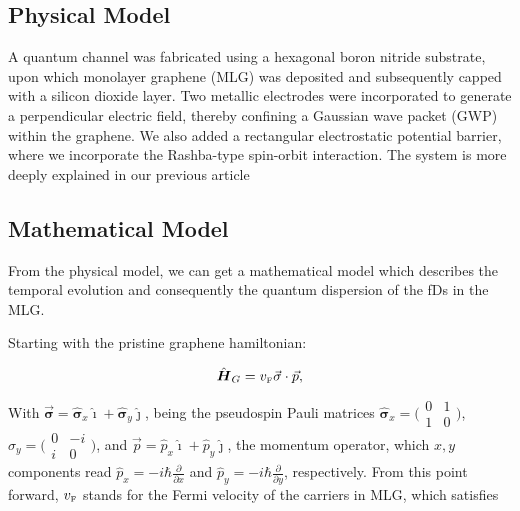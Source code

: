     \subsection{Physical Model}\label{subsec:physical-model}

    A quantum channel was fabricated using a hexagonal boron nitride substrate, upon which monolayer graphene (MLG) was deposited and subsequently capped with a silicon dioxide layer.
     Two metallic electrodes were incorporated to generate a perpendicular electric field, thereby confining a Gaussian wave packet (GWP) within the graphene.
     We also added a rectangular electrostatic potential barrier, where we incorporate the Rashba-type spin-orbit interaction.
     The system is more deeply explained in our previous article\cite{Serna2019}


    \subsection{Mathematical Model}\label{subsec:mathematical-model}

    From the physical model, we can get a mathematical model which describes the temporal evolution and consequently the quantum dispersion of the fDs in the MLG\@.

    Starting with the pristine graphene hamiltonian\cite{Geimk2007}:

    \begin{equation}
        \label{eq:pristGr}
        \hat{\mbox{\boldmath $H$}}_G = v_{\mbox{\tiny F}}\vec{\mathbf{\sigma}}\cdot\vec{p},
    \end{equation}

    \noindent With $\vec{\mathbf{\sigma}} = \hat{\mathbf{\sigma}}_{x}\hat{\imath} + \hat{\mathbf{\sigma}}_{y}\hat{\jmath}$, being the pseudospin Pauli matrices $\hat{\mathbf{\sigma}}_{x} = \bigl(\begin{smallmatrix}0&1 \\ 1&0\end{smallmatrix} \bigr)$, $\hat{\sigma}_{y} = \bigl(\begin{smallmatrix}0&-i \\ i&0\end{smallmatrix} \bigr)$, and $\vec{p}=\hat{p}_{x}\hat{\imath}+\hat{p}_{y}\hat{\jmath}$, the momentum operator, which $x, y$ components read $\hat{p}_{x} = -i\hbar\frac{\partial}{\partial x}$ and $\hat{p}_{y} = -i\hbar\frac{\partial}{\partial y}$, respectively.
    From this point forward, $v_{\mbox{\tiny F}}$ stands for the Fermi velocity of the carriers in MLG, which satisfies

